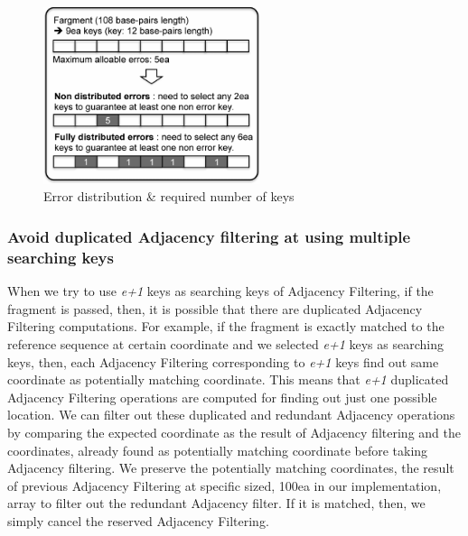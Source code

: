 \begin{figure}[b] \centering \vspace{0.1in}
\includegraphics[width=2.5in]{./figure/pigeon_B.pdf} \vspace{0in}
\caption{Error distribution \& required number of keys}
\label{fig:pigeon} 
\end{figure}

\subsubsection{Avoid duplicated Adjacency filtering at using multiple searching keys}

When we try to use \textit{e+1} keys as searching keys of Adjacency Filtering,
if the fragment is passed, then, it is possible that there are duplicated
Adjacency Filtering computations. For example, if the fragment is exactly
matched to the reference sequence at certain coordinate and we selected
\textit{e+1} keys as searching keys, then, each Adjacency Filtering
corresponding to \textit{e+1} keys find out same coordinate as potentially
matching coordinate. This means that \textit{e+1} duplicated Adjacency
Filtering operations are computed for finding out just one possible location.
We can filter out these duplicated and redundant Adjacency operations by
comparing the expected coordinate as the result of Adjacency filtering and the
coordinates, already found as potentially matching coordinate before taking
Adjacency filtering. We preserve the potentially matching coordinates, the
result of previous Adjacency Filtering at specific sized, 100ea in our
implementation, array to filter out the redundant Adjacency filter. If it is
matched, then, we simply cancel the reserved Adjacency Filtering.

